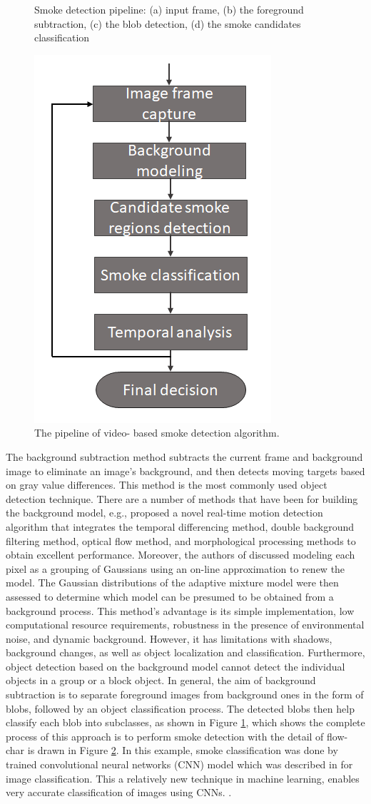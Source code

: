 \begin{figure}
{}
\caption{Smoke detection pipeline: (a) input frame, (b) the foreground subtraction, (c) the blob detection, (d) the smoke candidates classification }
\label{fig:bgmethod}
\end{figure}
\begin{figure}
\centering
 \includegraphics[width=0.3\linewidth]{Figures/smoke.jpg}
 \caption{The pipeline of video- based smoke detection algorithm.}
 \label{fig:smoke}
\end{figure}
The background subtraction method \cite{lee2012adaptive}\cite{stauffer1999adaptive} subtracts the current frame and background image to eliminate an image’s background, and then detects moving targets based on gray value differences. This method is the most commonly used object detection technique. There are a number of methods that have been for building the background model, e.g.,  \cite{lu2008improved} proposed a novel real-time motion detection algorithm that integrates the temporal differencing method, double background filtering method, optical flow method, and morphological processing methods to obtain excellent performance. Moreover, the authors of \cite{stauffer1999adaptive} discussed modeling each pixel as a grouping of Gaussians using an on-line approximation to renew the model. The Gaussian distributions of the adaptive mixture model were then assessed to determine which model can be presumed to be obtained from a background process. This method’s advantage is its simple implementation, low computational resource requirements, robustness in the presence of environmental noise, and dynamic background. However, it has limitations with shadows, background changes, as well as object localization and classification. Furthermore, object detection based on the background model cannot detect the individual objects in a group or a block object. In general, the aim of background subtraction is to separate foreground images from background ones in the form of blobs, followed by an object classification process. The detected blobs then help classify each blob into subclasses, as shown in Figure \ref{fig:bgmethod}, which shows the complete process of this approach is to perform smoke detection with the detail of flow-char is drawn in Figure \ref{fig:smoke}. In this example, smoke classification was done by trained convolutional neural networks (CNN) model which was described in \cite{krizhevsky2017imagenet} for image classification. This a relatively new technique in machine learning, enables very accurate classification of images using CNNs. \cite{lecun2010convolutional}\cite{jarrett2009best}\cite{lee2009convolutional}. 
